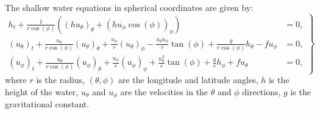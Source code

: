 The shallow water equations in spherical coordinates are given by:
\begin{equation}
    \left.
    \begin{aligned}
        h_t + \frac{1}{r \cos (\phi)} \left( {(h u_\theta)}_{\theta} + {(h u_{\phi} \cos(\phi))}_{\phi}  \right) &= 0, \\
        {(u_{\theta})}_t  + \frac{u_\theta}{r \cos (\phi)} {(u_\theta)}_\theta + \frac{u_\phi}{r} {(u_\theta)}_{\phi}
        - \frac{u_\theta u_\phi }{r} \tan(\phi) + \frac{g}{r \cos (\phi)} h_\theta - f u_\phi &= 0, \\
        {(u_{\phi})}_t  + \frac{u_\theta}{r \cos (\phi)} {(u_\phi)}_\theta + \frac{u_\phi}{r} {(u_\phi)}_{\phi}
        + \frac{u_\theta^2}{r} \tan(\phi) + \frac{g}{r} h_\phi + f u_\theta &= 0,
    \end{aligned}
    \right\}
\end{equation}
where $r$ is the radius, $(\theta, \phi)$ are the longitude and latitude angles, $h$ is the height of the water, $u_\theta$ and $u_\phi$ are the velocities in the $\theta$ and $\phi$ directions, $g$ is the gravitational constant.



